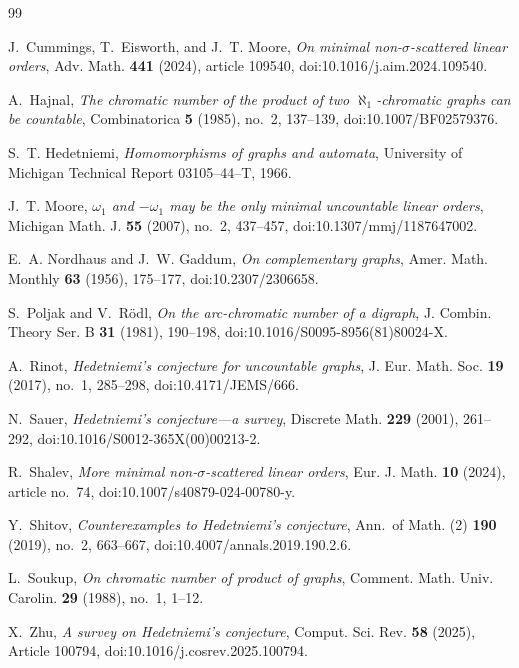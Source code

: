 \documentclass[10pt,a4paper]{amsart}
\numberwithin{equation}{section}
\theoremstyle{definition}
\theoremstyle{remark}
\begin{document}
\begin{thebibliography}{99}

J.~Cummings, T.~Eisworth, and J.~T. Moore,
\emph{On minimal non-$\sigma$-scattered linear orders},
Adv. Math. \textbf{441} (2024), article 109540,
doi:10.1016/j.aim.2024.109540.

A.~Hajnal,
\emph{The chromatic number of the product of two
$\aleph_1$-chromatic graphs can be countable},
Combinatorica \textbf{5} (1985), no.~2, 137--139,
doi:10.1007/BF02579376.

S.~T. Hedetniemi,
\emph{Homomorphisms of graphs and automata},
University of Michigan Technical Report 03105--44--T, 1966.

J.~T. Moore,
\emph{$\omega_1$ and $-\omega_1$ may be the only minimal uncountable
linear orders},
Michigan Math. J. \textbf{55} (2007), no.~2, 437--457,
doi:10.1307/mmj/1187647002.

E.~A. Nordhaus and J.~W. Gaddum,
\emph{On complementary graphs},
Amer. Math. Monthly \textbf{63} (1956), 175--177,
doi:10.2307/2306658.

S.~Poljak and V.~R\"odl,
\emph{On the arc-chromatic number of a digraph},
J. Combin. Theory Ser. B \textbf{31} (1981), 190--198,
doi:10.1016/S0095-8956(81)80024-X.

A.~Rinot,
\emph{Hedetniemi's conjecture for uncountable graphs},
J. Eur. Math. Soc. \textbf{19} (2017), no.~1, 285--298,
doi:10.4171/JEMS/666.

N.~Sauer,
\emph{Hedetniemi's conjecture---a survey},
Discrete Math. \textbf{229} (2001), 261--292,
doi:10.1016/S0012-365X(00)00213-2.

R.~Shalev,
\emph{More minimal non-$\sigma$-scattered linear orders},
Eur. J. Math. \textbf{10} (2024), article no.~74,
doi:10.1007/s40879-024-00780-y.

Y.~Shitov,
\emph{Counterexamples to Hedetniemi's conjecture},
Ann.\ of Math. (2) \textbf{190} (2019), no.~2, 663--667,
doi:10.4007/annals.2019.190.2.6.

L.~Soukup,
\emph{On chromatic number of product of graphs},
Comment. Math. Univ. Carolin. \textbf{29} (1988), no.~1, 1--12.

X.~Zhu,
\emph{A survey on Hedetniemi's conjecture},
Comput. Sci. Rev. \textbf{58} (2025), Article 100794,
doi:10.1016/j.cosrev.2025.100794.

\end{thebibliography}
\end{document}

